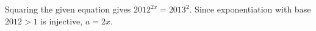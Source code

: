 Squaring the given equation gives $2012^{2x}=2013^2$. Since exponentiation with base $2012>1$ is injective, $\boxed{a=2x}$.
